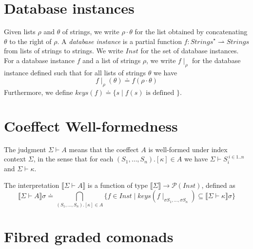\documentclass{article}
\newcommand{\sem}[1]{\llbracket #1 \rrbracket}
\begin{document}
\section*{Database instances}

Given lists $\rho$ and $\theta$ of strings, we write $\rho \cdot \theta$ for the list obtained by concatenating $\theta$ to the right of $\rho$.
A \emph{database instance} is a partial function $f : \mathit{Strings}^{\star} \rightharpoonup \mathit{Strings}$ from lists of strings to strings. We write $\mathit{Inst}$ for the set of database instances. For a database instance $f$ and a list of strings $\rho$, we write $f \! \mid_\rho$ for the database instance defined such that for all lists of strings $\theta$ we have $$f \! \mid_\rho \! (\theta) \doteq f(\rho \cdot \theta)$$
Furthermore, we define $\mathit{keys}(f) \doteq \{ s \mid f(s) \text{ is defined } \}$.

\section*{Coeffect Well-formedness}

The judgment $\Sigma \vdash A$ means that the coeffect $A$ is well-formed under index context $\Sigma$,
in the sense that for each $(S_1,\ldots,S_n).[\kappa] \in A$ we have $\Sigma \vdash S_i^{~i \in 1..n}$ and $\Sigma \vdash \kappa$.

The interpretation $\sem{\Sigma \vdash A}$ is a function of type $\sem{\Sigma} \to \mathcal{P}(\mathit{Inst})$, defined as $$\sem{\Sigma \vdash A}\sigma \doteq \bigcap_{(S_1,\ldots,S_n).[\kappa] \in A} \{ f \in \mathit{Inst} \mid \mathit{keys}(f \! \mid_{\sigma S_1, \ldots, \sigma S_n}) \subseteq \sem{\Sigma \vdash \kappa} \sigma \}$$

\section*{Fibred graded comonads}
\end{document}
